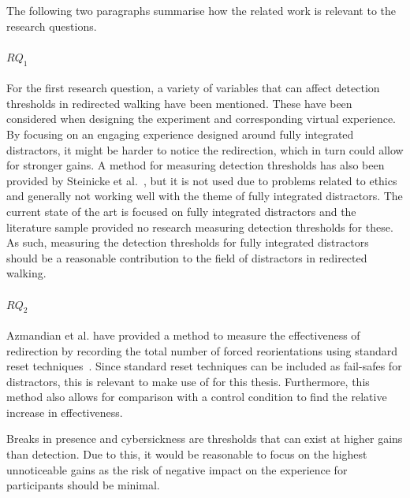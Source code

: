 The following two paragraphs summarise how the related work is relevant to the research questions.

\paragraph{$RQ_1$}
For the first research question, a variety of variables that can affect detection thresholds in redirected walking have been mentioned. These have been considered when designing the experiment and corresponding virtual experience. By focusing on an engaging experience designed around fully integrated distractors, it might be harder to notice the redirection, which in turn could allow for stronger gains. A method for measuring detection thresholds has also been provided by Steinicke et al.~\cite{5072212}, but it is not used due to problems related to ethics and generally not working well with the theme of fully integrated distractors. The current state of the art is focused on fully integrated distractors and the literature sample provided no research measuring detection thresholds for these. As such, measuring the detection thresholds for fully integrated distractors should be a reasonable contribution to the field of distractors in redirected walking.

\paragraph{$RQ_2$}
Azmandian et al. have provided a method to measure the effectiveness of redirection by recording the total number of forced reorientations using standard reset techniques~\cite{azmandian2015physical}. Since standard reset techniques can be included as fail-safes for distractors, this is relevant to make use of for this thesis. Furthermore, this method also allows for comparison with a control condition to find the relative increase in effectiveness.

Breaks in presence and cybersickness are thresholds that can exist at higher gains than detection. Due to this, it would be reasonable to focus on the highest unnoticeable gains as the risk of negative impact on the experience for participants should be minimal. 


